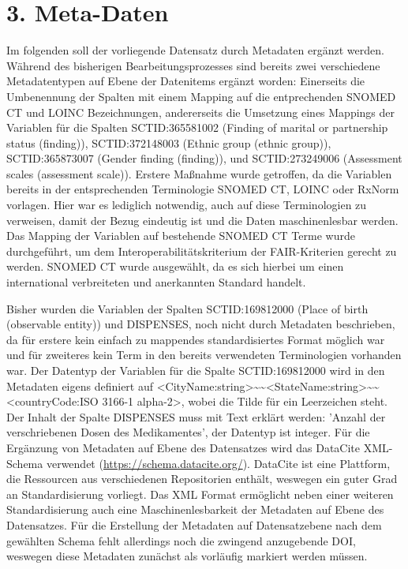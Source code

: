 \documentclass[12pt,a4paper,toc=bibliographynumbered,toc=indenttextentries]{scrreprt}
\begin{document}
		\section*{3. Meta-Daten}
		Im folgenden soll der vorliegende Datensatz durch Metadaten ergänzt werden. Während des bisherigen Bearbeitungsprozesses sind bereits zwei verschiedene Metadatentypen auf Ebene der Datenitems ergänzt worden: Einerseits die Umbenennung der Spalten mit einem Mapping auf die entprechenden SNOMED CT und LOINC Bezeichnungen, andererseits die Umsetzung eines Mappings der Variablen für die Spalten SCTID:365581002 (Finding of marital or partnership status (finding)), SCTID:372148003 (Ethnic group (ethnic group)), SCTID:365873007 (Gender finding (finding)), und SCTID:273249006 (Assessment scales (assessment scale)).
		Erstere Maßnahme wurde getroffen, da die Variablen bereits in der entsprechenden Terminologie SNOMED CT, LOINC oder RxNorm vorlagen. Hier war es lediglich notwendig, auch auf diese Terminologien zu verweisen, damit der Bezug eindeutig ist und die Daten maschinenlesbar werden. Das Mapping der Variablen auf bestehende SNOMED CT Terme wurde durchgeführt, um dem Interoperabilitätskriterium der FAIR-Kriterien gerecht zu werden. SNOMED CT wurde ausgewählt, da es sich hierbei um einen international verbreiteten und anerkannten Standard handelt.\par
		Bisher wurden die Variablen der Spalten SCTID:169812000 (Place of birth (observable entity)) und DISPENSES, noch nicht durch Metadaten beschrieben, da für erstere kein einfach zu mappendes standardisiertes Format möglich war und für zweiteres kein Term in den bereits verwendeten Terminologien vorhanden war. Der Datentyp der Variablen für die Spalte SCTID:169812000 wird in den Metadaten eigens definiert auf \textsf{<CityName:string>\~{}\~{}<StateName:string>\~{}\~{}<countryCode:ISO 3166-1 alpha-2>}, wobei die Tilde für ein Leerzeichen steht. Der Inhalt der Spalte DISPENSES muss mit Text erklärt werden: 'Anzahl der verschriebenen Dosen des Medikamentes', der Datentyp ist \textsf{integer}.
		Für die Ergänzung von Metadaten auf Ebene des Datensatzes wird das DataCite XML-Schema verwendet (\url{https://schema.datacite.org/}). DataCite ist eine Plattform, die Ressourcen aus verschiedenen Repositorien enthält, weswegen ein guter Grad an Standardisierung vorliegt. Das XML Format ermöglicht neben einer weiteren Standardisierung auch eine Maschinenlesbarkeit der Metadaten auf Ebene des Datensatzes. Für die Erstellung der Metadaten auf Datensatzebene nach dem gewählten Schema fehlt allerdings noch die zwingend anzugebende DOI, weswegen diese Metadaten zunächst als vorläufig markiert werden müssen.
\end{document}
